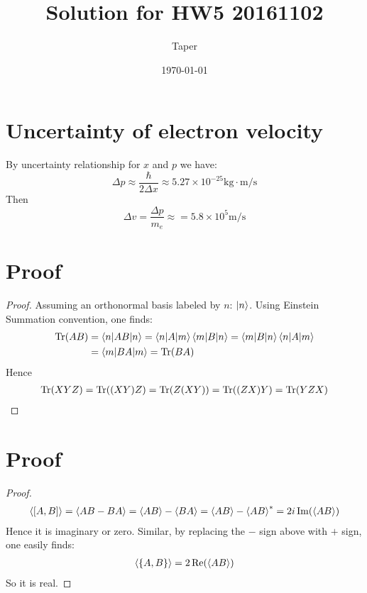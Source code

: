 \documentclass{article}
\title{Solution for HW5 20161102}
\date{\today}
\author{Taper}
\begin{document}
\maketitle
{}
\section{Uncertainty of electron velocity}

By uncertainty relationship for $x$ and $p$ we have:
\begin{equation}
    \Delta p \approx \frac{\hbar}{2\Delta x} \approx 5.27\times
    10^{-25} \text{kg}\cdot\text{m/s}
\end{equation}
Then
\begin{equation}
    \Delta v = \frac{\Delta p }{m_e} \approx = 5.8\times 10^5
    \text{m/s}
\end{equation}
\section{Proof}
\begin{proof}
Assuming an orthonormal basis labeled by $n$: $\ket{n}$. Using
Einstein Summation convention, one finds:
\begin{align*}
    \operatorname{Tr}(AB) &= \braket{n|AB|n} = \braket{n|A|m}\braket{m|B|n}
      = \braket{m|B|n}\braket{n|A|m} \\
      &= \braket{m|BA|m} = \operatorname{Tr}(BA)
\end{align*}
Hence
\begin{align*}
    \operatorname{Tr}(XYZ) = \operatorname{Tr}( (XY) Z) = \operatorname{Tr}(Z (XY)) = \operatorname{Tr}( (ZX) Y) = \operatorname{Tr}(YZX)
\end{align*}
\end{proof}

\section{Proof}
\begin{proof}
\begin{align*}
    \braket{[A,B]} = \braket{ AB-BA} = \braket{AB} - \braket{BA} =
    \braket{AB}-\braket{AB}^* = 2i \Im(\braket{AB})
\end{align*}
Hence it is imaginary or zero. Similar, by replacing the $-$ sign
above with $+$ sign, one easily finds:
\begin{align*}
    \braket{\{A,B\}} = 2\Re(\braket{AB})
\end{align*}
So it is real.
\end{proof}
\end{document}
